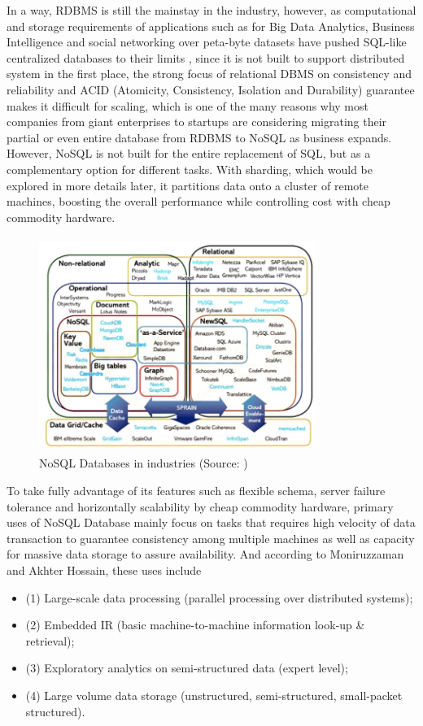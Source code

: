 In a way, RDBMS is still the mainstay in the industry, however, as computational and storage requirements of applications such as for
Big Data Analytics, Business Intelligence and social networking over peta-byte
datasets have pushed SQL-like centralized databases to their limits \cite{DBLP:journals/corr/MoniruzzamanH13}, since it is not built to support distributed system in the first place, the strong focus of relational DBMS on consistency and reliability
and ACID (Atomicity, Consistency, Isolation and
Durability)\cite{neo} guarantee makes it difficult for scaling, which is one of
the many reasons why most companies from giant enterprises to startups are considering migrating their partial or even entire database from RDBMS to NoSQL as business expands. However, NoSQL is not built for the entire replacement of SQL, but as a complementary option for different tasks.
  With sharding, which would be explored in more details later, it partitions data onto a cluster of remote machines, boosting the overall performance while controlling cost with cheap commodity hardware. \\
  
  
\begin{figure}[H]
	\includegraphics[height=7cm, width=9cm]{../../images/nosql.png}
	\caption{NoSQL Databases in industries (Source: \cite{DBLP:journals/corr/MoniruzzamanH13})}
\end{figure}

  
To take fully advantage of its features such as flexible schema, server failure tolerance and  horizontally scalability by cheap commodity hardware, primary uses of NoSQL Database mainly focus on tasks that requires high velocity of data transaction to guarantee consistency among multiple machines as well as capacity for massive data storage to assure availability. And according to Moniruzzaman and Akhter Hossain\cite{DBLP:journals/corr/MoniruzzamanH13}, these uses include 
\begin{itemize}
\item (1) Large-scale data processing (parallel
 processing over distributed systems); 
 \item (2) Embedded IR (basic machine-to-machine
 information look-up \& retrieval); 
 \item (3) Exploratory analytics on semi-structured data (expert
 level); 
 \item (4) Large volume data storage (unstructured, semi-structured, small-packet structured).
\end{itemize}


